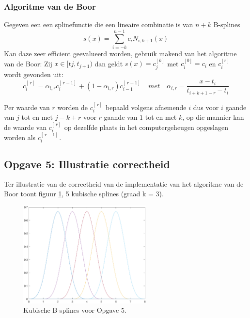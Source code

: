 \documentclass[a4paper]{article}
\newcommand{\opgave}[1]{\subsection{Opgave #1}}
\begin{document}
\subsubsection{Algoritme van de Boor}
Gegeven een een splinefunctie die een lineaire combinatie is van $n+k$ B-splines
\begin{equation}\label{eq:deboor}
	s(x) = \sum\limits_{i=-k}^{n-1} c_iN_{i, k+1}(x)
\end{equation}
Kan daze zeer efficient geevalueerd worden, gebruik makend van het algoritme van de Boor:
Zij $x\in[t{j}, t_{j+1})$ dan geldt $s(x)=c_{j}^{[k]}$ met $c_i^{[0]} = c_i$ en $c_i^{[r]}$ wordt gevonden uit:
\begin{equation}\label{eq:deboorcoef}
	c_i^{[\, r]\, } = \alpha_{i,r} c_i^{[\, r-1]\, } + (1-\alpha_{i,r})c_{i-1}^{[\, r-1]\, } \quad met \quad \alpha_{i,r} = \frac{x-t_i}{t_{i+k+1-r}-t_i}
\end{equation}

Per waarde van $r$ worden de $c_i^{[\, r]\, }$ bepaald volgens afnemende $i$ dus voor $i$ gaande van $j$ tot en met $j-k+r$ voor $r$ gaande van $1$ tot en met $k$, op die mannier kan de waarde van $c_i^{[\, r]\, }$ op dezelfde plaats in het computergeheugen opgeslagen worden als $c_i^{[\, r-1]\, }$.




\opgave{5: Illustratie correctheid}\label{sec:oef5}
Ter illustratie van de correctheid van de implementatie van het algoritme van de Boor toont figuur \ref{fig:splines}, 5 kubische splines (graad k = 3).

\begin{figure}[H]
	\begin{center} 
		\includegraphics[width=0.6\textwidth]{BSplines.eps}
	\end{center}
	\caption{Kubische B-splines voor Opgave 5.}
	\label{fig:splines}
\end{figure}
\newpage
\end{document}

